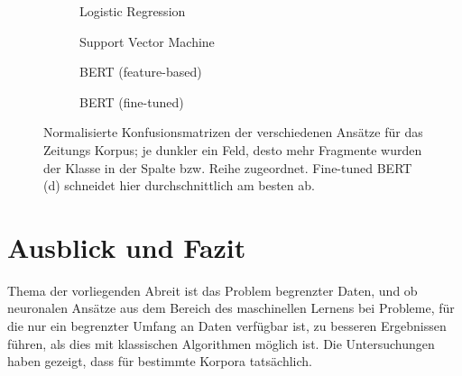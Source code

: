 \begin{figure}
\centering
\begin{subfigure}[b]{.45\linewidth}

\caption{Logistic Regression}\label{fig:zeitung-log}
\end{subfigure}
\begin{subfigure}[b]{.45\linewidth}

\caption{Support Vector Machine}\label{fig:zeitung-svm}
\end{subfigure}

\begin{subfigure}[b]{.45\linewidth}

\caption{BERT (feature-based)}\label{fig:zeitung-feat}
\end{subfigure}
\begin{subfigure}[b]{.45\linewidth}

\caption{BERT (fine-tuned)}\label{fig:zeitung-fine}
\end{subfigure}
\caption{Normalisierte Konfusionsmatrizen der verschiedenen Ansätze für das Zeitungs Korpus; je dunkler ein Feld, desto mehr Fragmente wurden der Klasse in der Spalte bzw. Reihe zugeordnet. Fine-tuned BERT (d) schneidet hier durchschnittlich am besten ab.}
\label{fig:zeitung}
\end{figure}





\chapter{Ausblick und Fazit}
\label{fazit}
Thema der vorliegenden Abreit ist das Problem begrenzter Daten, und ob neuronalen Ansätze aus dem Bereich des maschinellen Lernens bei Probleme, für die nur ein begrenzter Umfang an Daten verfügbar ist, zu besseren Ergebnissen führen, als dies mit klassischen Algorithmen möglich ist. Die Untersuchungen haben gezeigt, dass für bestimmte Korpora tatsächlich.


